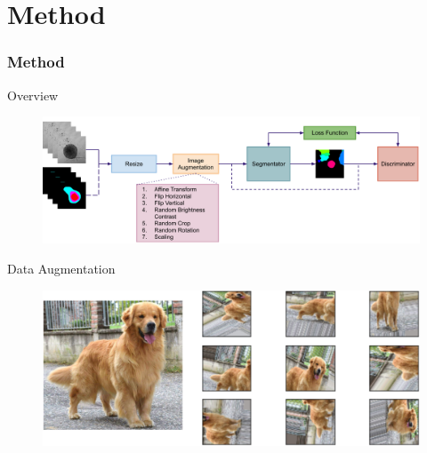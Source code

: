 \section{Method}


\begin{frame}{}
    \frametitle{Method}
\end{frame}


\begin{frame}{Overview}
    \begin{figure}[!htb]
    \centering
        \includegraphics[width=15cm]{figures/method/overview}
        \label{fig:method_overview}
    \end{figure}
\end{frame}


\begin{frame}{Data Augmentation}
    \begin{figure}
        \centering
        \includegraphics[width=13cm\textwidth]{figures/method/data_augmentation}
    \end{figure}
\end{frame}


